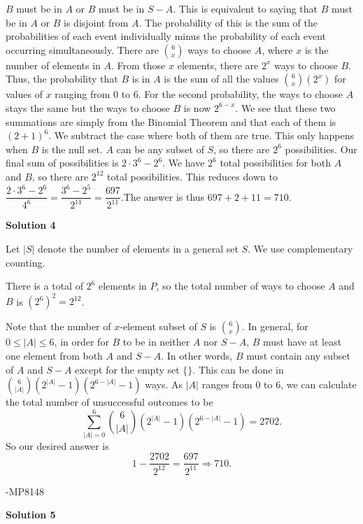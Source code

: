 \begin{enumerate}
$B$ must be in $A$ or $B$ must be in $S-A$. This is equivalent to saying that $B$ must be in $A$ or $B$ is disjoint from $A$. The probability of this is the sum of the probabilities of each event individually minus the probability of each event occurring simultaneously. There are $\binom{6}{x}$ ways to choose $A$, where $x$ is the number of elements in $A$. From those $x$ elements, there are ${2^x}$ ways to choose $B$. Thus, the probability that $B$ is in $A$ is the sum of all the values $\binom{6}{x}({2^x})$ for values of $x$ ranging from $0$ to $6$. For the second probability, the ways to choose $A$ stays the same but the ways to choose $B$ is now ${2^{6-x}}$. We see that these two summations are simply from the Binomial Theorem and that each of them is ${(2+1)^6}$. We subtract the case where both of them are true. This only happens when $B$ is the null set. $A$ can be any subset of $S$, so there are ${2^6}$ possibilities. Our final sum of possibilities is $2\cdot 3^6-2^6$. We have ${2^6}$ total possibilities for both $A$ and $B$, so there are ${2^{12}}$ total possibilities. This reduces down to $\dfrac{2\cdot 3^6-2^6}{4^6}= \dfrac{3^6-2^5}{2^{11}}=\dfrac{697}{2^{11}}$.The answer is thus $697 + 2 + 11 = 710$.

 



\textbf{Solution 4}

Let $|S|$ denote the number of elements in a general set $S$. We use complementary counting. 

 There is a total of $2^6$ elements in $P$, so the total number of ways to choose $A$ and $B$ is $(2^6)^2 = 2^{12}$.

 Note that the number of $x$-element subset of $S$ is $\binom{6}{x}$. In general, for $0 \le |A| \le 6$, in order for $B$ to be in neither $A$ nor $S-A$, $B$ must have at least one element from both $A$ and $S-A$. In other words, $B$ must contain any subset of $A$ and $S-A$ except for the empty set $\{\}$. This can be done in $\binom{6}{|A|} (2^{|A|} - 1)(2^{6-|A|} - 1)$ ways. As $|A|$ ranges from $0$ to $6$, we can calculate the total number of unsuccessful outcomes to be 
 \[\sum_{|A| = 0}^{6} \binom{6}{|A|} (2^{|A|} - 1)(2^{6-|A|} - 1) = 2702.\] So our desired answer is 
 \[1 - \dfrac{2702}{2^{12}} = \dfrac{697}{2^{11}} \Rightarrow \boxed{710}.\]

 -MP8148

 



\textbf{Solution 5}


\end{enumerate}

